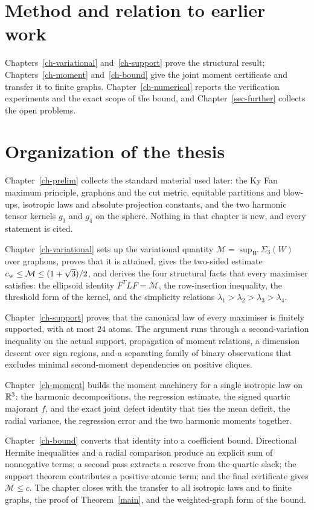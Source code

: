 \section{Method and relation to earlier work}\label{sec-method}


Chapters~\ref{ch-variational} and~\ref{ch-support} prove the structural
result; Chapters~\ref{ch-moment} and~\ref{ch-bound} give the joint moment
certificate and transfer it to finite graphs. Chapter~\ref{ch-numerical}
reports the verification experiments and the exact scope of the bound, and
Chapter~\ref{sec-further} collects the open problems.

\section{Organization of the thesis}\label{sec-organization}
Chapter~\ref{ch-prelim} collects the standard material used later: the Ky Fan
maximum principle, graphons and the cut metric, equitable partitions and
blow-ups, isotropic laws and absolute projection constants, and the two
harmonic tensor kernels $g_3$ and $g_4$ on the sphere. Nothing in that
chapter is new, and every statement is cited.

Chapter~\ref{ch-variational} sets up the variational quantity
$\mathcal M=\sup_W\Sigma_3(W)$ over graphons, proves that it is attained,
gives the two-sided estimate
$c_{\mathrm{w}}\le\mathcal M\le(1+\sqrt3)/2$, and derives the four structural facts
that every maximiser satisfies: the ellipsoid identity $F^TLF=\mathcal M$,
the row-insertion inequality, the threshold form of the kernel, and the
simplicity relations $\lambda_1>\lambda_2>\lambda_3>\lambda_4$.

Chapter~\ref{ch-support} proves that the canonical law of every maximiser is
finitely supported, with at most $24$ atoms. The argument runs through a
second-variation inequality on the actual support, propagation of moment
relations, a dimension descent over sign regions, and a separating family of
binary observations that excludes minimal second-moment dependencies on
positive cliques.

Chapter~\ref{ch-moment} builds the moment machinery for a single isotropic
law on $\mathbb R^3$: the harmonic decompositions, the regression estimate, the
signed quartic majorant $f$, and the exact joint defect identity that ties the
mean deficit, the radial variance, the regression error and the two harmonic
moments together.

Chapter~\ref{ch-bound} converts that identity into a coefficient bound.
Directional Hermite inequalities and a radial comparison produce an explicit
sum of nonnegative terms; a second pass extracts a reserve from the quartic
slack; the support theorem contributes a positive atomic term; and the final
certificate gives $\mathcal M\le c$. The chapter closes with the transfer to
all isotropic laws and to finite graphs, the proof of
Theorem~\ref{main}, and the weighted-graph form of the bound.

